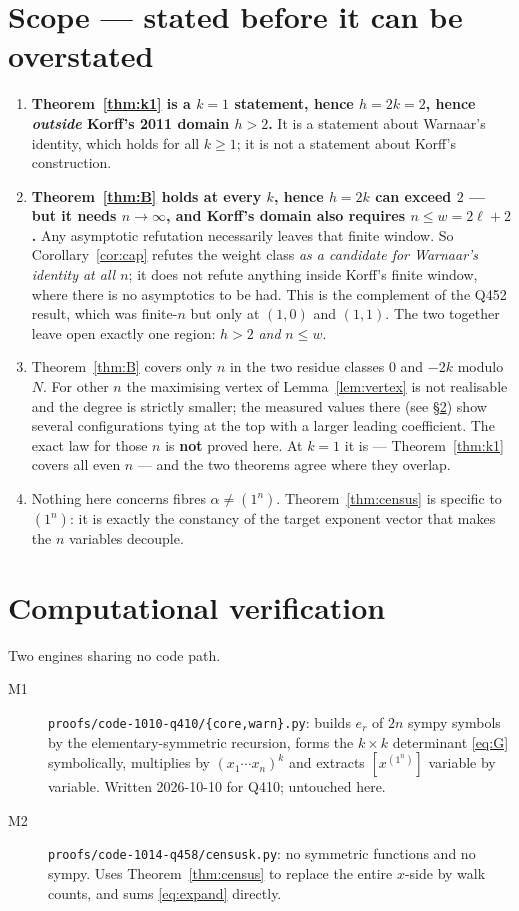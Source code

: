 \documentclass[11pt]{article}
\theoremstyle{plain}
\theoremstyle{definition}
\theoremstyle{remark}
\newcommand{\onen}{(1^{n})}
\begin{document}
\section{Scope --- stated before it can be overstated}\label{sec:scope}

\begin{enumerate}
\item \textbf{Theorem~\ref{thm:k1} is a $k=1$ statement, hence $h=2k=2$, hence
\emph{outside} Korff's 2011 domain $h>2$.} It is a statement about Warnaar's identity,
which holds for all $k\ge1$; it is not a statement about Korff's construction.
\item \textbf{Theorem~\ref{thm:B} holds at every $k$, hence $h=2k$ can exceed $2$ --- but
it needs $n\to\infty$, and Korff's domain also requires $n\le w=2\ell+2$.} Any asymptotic
refutation necessarily leaves that finite window. So Corollary~\ref{cor:cap} refutes the
weight class \emph{as a candidate for Warnaar's identity at all $n$}; it does not refute
anything inside Korff's finite window, where there is no asymptotics to be had. This is
the complement of the Q452 result, which was finite-$n$ but only at $(1,0)$ and $(1,1)$.
The two together leave open exactly one region: $h>2$ \emph{and} $n\le w$.
\item Theorem~\ref{thm:B} covers only $n$ in the two residue classes $0$ and $-2k$ modulo
$N$. For other $n$ the maximising vertex of Lemma~\ref{lem:vertex} is not realisable and
the degree is strictly smaller; the measured values there (see \S\ref{sec:verif}) show
several configurations tying at the top with a larger leading coefficient. The exact law
for those $n$ is \textbf{not} proved here. At $k=1$ it is --- Theorem~\ref{thm:k1} covers
all even $n$ --- and the two theorems agree where they overlap.
\item Nothing here concerns fibres $\alpha\ne\onen$. Theorem~\ref{thm:census} is specific
to $\onen$: it is exactly the constancy of the target exponent vector that makes the $n$
variables decouple.
\end{enumerate}

\section{Computational verification}\label{sec:verif}

Two engines sharing no code path.

\begin{description}
\item[M1] \texttt{proofs/code-1010-q410/\{core,warn\}.py}: builds $e_r$ of $2n$ sympy
symbols by the elementary-symmetric recursion, forms the $k\times k$ determinant
\eqref{eq:G} symbolically, multiplies by $(x_1\cdots x_n)^k$ and extracts
$[x^{(1^n)}]$ variable by variable. Written 2026-10-10 for Q410; untouched here.
\item[M2] \texttt{proofs/code-1014-q458/censusk.py}: no symmetric functions and no sympy.
Uses Theorem~\ref{thm:census} to replace the entire $x$-side by walk counts, and sums
\eqref{eq:expand} directly.
\end{description}
\end{document}
